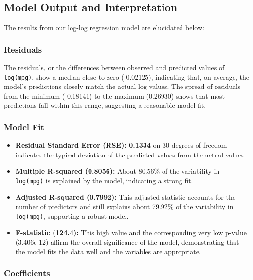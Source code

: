 \documentclass[
  letterpaper,
  DIV=11,
  numbers=noendperiod]{scrreport}
\begin{document}
\subsection{Model Output and
Interpretation}\label{model-output-and-interpretation}

The results from our log-log regression model are elucidated below:

\subsubsection{Residuals}\label{residuals}

The residuals, or the differences between observed and predicted values
of \texttt{log(mpg)}, show a median close to zero (-0.02125), indicating
that, on average, the model's predictions closely match the actual log
values. The spread of residuals from the minimum (-0.18141) to the
maximum (0.26930) shows that most predictions fall within this range,
suggesting a reasonable model fit.

\subsubsection{Model Fit}\label{model-fit}

\begin{itemize}
\item
  \textbf{Residual Standard Error (RSE): 0.1334} on 30 degrees of
  freedom indicates the typical deviation of the predicted values from
  the actual values.
\item
  \textbf{Multiple R-squared (0.8056):} About 80.56\% of the variability
  in \texttt{log(mpg)} is explained by the model, indicating a strong
  fit.
\item
  \textbf{Adjusted R-squared (0.7992):} This adjusted statistic accounts
  for the number of predictors and still explains about 79.92\% of the
  variability in \texttt{log(mpg)}, supporting a robust model.
\item
  \textbf{F-statistic (124.4):} This high value and the corresponding
  very low p-value (3.406e-12) affirm the overall significance of the
  model, demonstrating that the model fits the data well and the
  variables are appropriate.
\end{itemize}

\subsubsection{Coefficients}\label{coefficients}
\end{document}
